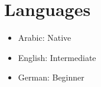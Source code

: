 \section{Languages}

\begin{itemize}
  \item Arabic: Native 
    \item  English: Intermediate
    \item  German: Beginner
\end{itemize}